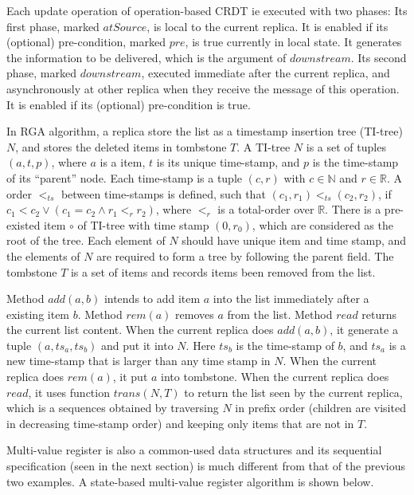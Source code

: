 Each update operation of operation-based CRDT ie executed with two phases: Its first phase, marked $\mathit{atSource}$, is local to the current replica. It is enabled if its (optional) pre-condition, marked $\mathit{pre}$, is true currently in local state. It generates the information to be delivered, which is the argument of $\mathit{downstream}$. Its second phase, marked $\mathit{downstream}$, executed immediate after the current replica, and asynchronously at other replica when they receive the message of this operation. It is enabled if its (optional) pre-condition is true.

In RGA algorithm, a replica store the list as a timestamp insertion tree (TI-tree) $N$, and stores the deleted items in tombstone $T$. A TI-tree $N$ is a set of tuples $(a,t,p)$, where $a$ is a item, $t$ is its unique time-stamp, and $p$ is the time-stamp of its ``parent'' node. Each time-stamp is a tuple $(c,r)$ with $c \in \mathbb{N}$ and $r \in \mathbb{R}$. A order $<_{\mathit{ts}}$ between time-stamps is defined, such that $(c_1,r_1) <_{\mathit{ts}} (c_2,r_2)$, if $c_1 < c_2 \vee (c_1 = c_2 \wedge r_1 <_r r_2)$, where $<_r$ is a total-order over $\mathbb{R}$. There is a pre-existed item $\circ$ of TI-tree with time stamp $(0,r_0)$, which are considered as the root of the tree. Each element of $N$ should have unique item and time stamp, and the elements of $N$ are required to form a tree by following the parent field. The tombstone $T$ is a set of items and records items been removed from the list.

Method $\mathit{add}(a,b)$ intends to add item $a$ into the list immediately after a existing item $b$. Method $\mathit{rem}(a)$ removes $a$ from the list. Method $\mathit{read}$ returns the current list content. When the current replica does $\mathit{add}(a,b)$, it generate a tuple $(a,ts_a,ts_b)$ and put it into $N$. Here $ts_b$ is the time-stamp of $b$, and $ts_a$ is a new time-stamp that is larger than any time stamp in $N$. When the current replica does $\mathit{rem}(a)$, it put $a$ into tombstone. When the current replica does $\mathit{read}$, it uses function $\mathit{trans}(N,T)$ to return the list seen by the current replica, which is a sequences obtained by traversing $N$ in prefix order (children are visited in decreasing time-stamp order) and keeping only items that are not in $T$.


Multi-value register is also a common-used data structures and its sequential specification (seen in the next section) is much different from that of the previous two examples. A state-based multi-value register algorithm is shown below.


